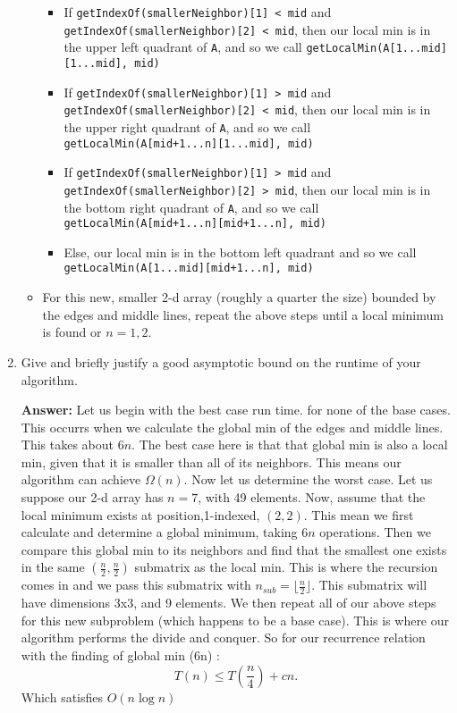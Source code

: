 \documentclass[11pt, oneside]{article}   	%
\theoremstyle{definition}
\theoremstyle{remark}
\newcommand\floor[1]{\lfloor#1\rfloor}
\begin{document}
\begin{enumerate}
\begin{itemize}
   \begin{itemize}
   \item If  \texttt{getIndexOf(smallerNeighbor)[1] < mid} and      \texttt{getIndexOf(smallerNeighbor)[2] < mid}, then our local min is in the upper left quadrant of \texttt{A}, and so we call \texttt{getLocalMin(A[1...mid][1...mid], mid)}
   \item If \texttt{getIndexOf(smallerNeighbor)[1] > mid} and      \texttt{getIndexOf(smallerNeighbor)[2] < mid}, then our local min is in the upper right quadrant of \texttt{A}, and so we call \texttt{getLocalMin(A[mid+1...n][1...mid], mid)}
   \item If \texttt{getIndexOf(smallerNeighbor)[1] > mid} and      \texttt{getIndexOf(smallerNeighbor)[2] > mid}, then our local min is in the bottom right quadrant of \texttt{A}, and so we call \texttt{getLocalMin(A[mid+1...n][mid+1...n], mid)}
   \item Else, our local min is in the bottom left quadrant and so we call \\
    \texttt{getLocalMin(A[1...mid][mid+1...n], mid)}
   \end{itemize}
   \item For this new, smaller 2-d array (roughly a quarter the size) bounded by the edges and middle lines, repeat the above steps until a local minimum is found or $n=1,2$.
   \end{itemize}
\item Give and briefly justify a good asymptotic bound on the runtime of
   your algorithm.
   
   \textbf{Answer: } Let us begin with the best case run time. for none of the base cases. This occurrs when we calculate the global min of the edges and middle lines. This takes about $6n$. The best case here is that that global min is also a local min, given that it is smaller than all of its neighbors. This means our algorithm can achieve $\Omega(n)$. Now let us determine the worst case. Let us suppose our 2-d array has $n=7$, with 49 elements. Now, assume that the local minimum exists at position,1-indexed, $(2,2)$. This mean we first calculate and determine a global minimum, taking $6n$ operations. Then we compare this global min to its neighbors and find that the smallest one exists in the same $(\frac{n}{2}, \frac{n}{2})$ submatrix as the local min. This is where the recursion comes in and we pass this submatrix with $n_{sub}=\floor{\frac{n}{2}}$. This submatrix will have dimensions 3x3, and 9 elements. We then repeat all of our above steps for this new subproblem (which happens to be a base case). This is where our algorithm performs the divide and conquer. So for our recurrence relation with the finding of global min (6n) : $$T(n) \leq T(\frac{n}{4}) + cn. $$ Which satisfies $O(n \log n)$
   

\end{enumerate}
\end{document}
